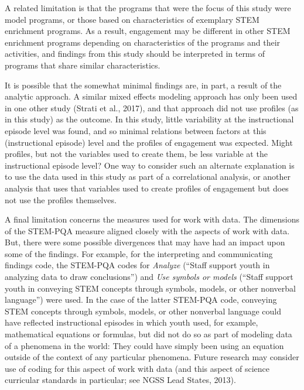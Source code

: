\documentclass[]{msu-thesis}
\theoremstyle{definition}
\theoremstyle{definition}
\theoremstyle{definition}
\theoremstyle{remark}
\begin{document}
A related limitation is that the programs that were the focus of this
study were model programs, or those based on characteristics of
exemplary STEM enrichment programs. As a result, engagement may be
different in other STEM enrichment programs depending on characteristics
of the programs and their activities, and findings from this study
should be interpreted in terms of programs that share similar
characteristics.

It is possible that the somewhat minimal findings are, in part, a result
of the analytic approach. A similar mixed effects modeling approach has
only been used in one other study (Strati et al., 2017), and that
approach did not use profiles (as in this study) as the outcome. In this
study, little variability at the instructional episode level was found,
and so minimal relations between factors at this (instructional episode)
level and the profiles of engagement was expected. Might profiles, but
not the variables used to create them, be less variable at the
instructional episode level? One way to consider such an alternate
explanation is to use the data used in this study as part of a
correlational analysis, or another analysis that uses that variables
used to create profiles of engagement but does not use the profiles
themselves.

A final limitation concerns the measures used for work with data. The
dimensions of the STEM-PQA measure aligned closely with the aspects of
work with data. But, there were some possible divergences that may have
had an impact upon some of the findings. For example, for the
interpreting and communicating findings code, the STEM-PQA codes for
\emph{Analyze} (``Staff support youth in analyzing data to draw
conclusions'') and \emph{Use symbols or models} (``Staff support youth
in conveying STEM concepts through symbols, models, or other nonverbal
language'') were used. In the case of the latter STEM-PQA code,
conveying STEM concepts through symbols, models, or other nonverbal
language could have reflected instructional episodes in which youth
used, for example, mathematical equations or formulas, but did not do so
as part of modeling data of a phenomena in the world: They could have
simply been using an equation outside of the context of any particular
phenomena. Future research may consider use of coding for this aspect of
work with data (and this aspect of science curricular standards in
particular; see NGSS Lead States, 2013).
\end{document}

